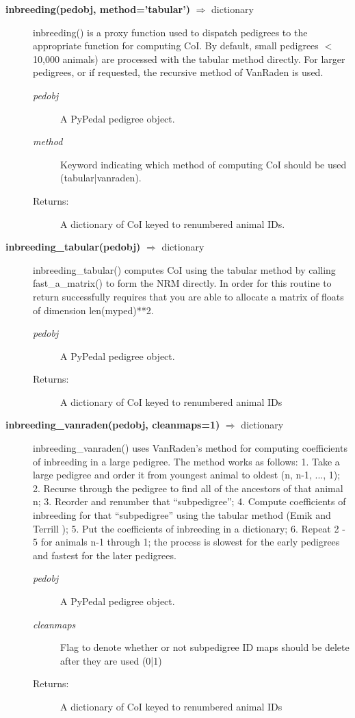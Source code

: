 \begin{description}
\item[\textbf{inbreeding(pedobj, method='tabular')} $\Rightarrow$ dictionary] 
inbreeding() is a proxy function used to dispatch pedigrees to the appropriate function for computing CoI. By default, small pedigrees $<$ 10,000 animals) are processed with the tabular method directly. For larger pedigrees, or if requested, the recursive method of VanRaden \cite{VanRaden1992a} is used.
\begin{description}
\item[\emph{pedobj}] A PyPedal pedigree object.
\item[\emph{method}] Keyword indicating which method of computing CoI should be used (tabular|vanraden).
\item[Returns:] A dictionary of CoI keyed to renumbered animal IDs.
\end{description}

\item[\textbf{inbreeding\_tabular(pedobj)} $\Rightarrow$ dictionary] 
inbreeding\_tabular() computes CoI using the tabular method by calling fast\_a\_matrix() to form the NRM directly. In order for this routine to return successfully requires that you are able to allocate a matrix of floats of dimension len(myped)**2.
\begin{description}
\item[\emph{pedobj}] A PyPedal pedigree object.
\item[Returns:] A dictionary of CoI keyed to renumbered animal IDs
\end{description}

\item[\textbf{inbreeding\_vanraden(pedobj, cleanmaps=1)} $\Rightarrow$ dictionary] 
inbreeding\_vanraden() uses VanRaden's \cite{VanRaden1992a} method for computing coefficients of inbreeding in a large pedigree. The method works as follows: 1. Take a large pedigree and order it from youngest animal to oldest (n, n-1, ..., 1); 2. Recurse through the pedigree to find all of the ancestors of that animal n; 3. Reorder and renumber that ``subpedigree''; 4. Compute coefficients of inbreeding for that ``subpedigree'' using the tabular method (Emik and Terrill \cite{Emik1949a}); 5. Put the coefficients of inbreeding in a dictionary; 6. Repeat 2 - 5 for animals n-1 through 1; the process is slowest for the early pedigrees and fastest for the later pedigrees.
\begin{description}
\item[\emph{pedobj}] A PyPedal pedigree object.
\item[\emph{cleanmaps}] Flag to denote whether or not subpedigree ID maps should be delete after they are used (0|1)
\item[Returns:] A dictionary of CoI keyed to renumbered animal IDs
\end{description}


\end{description}
